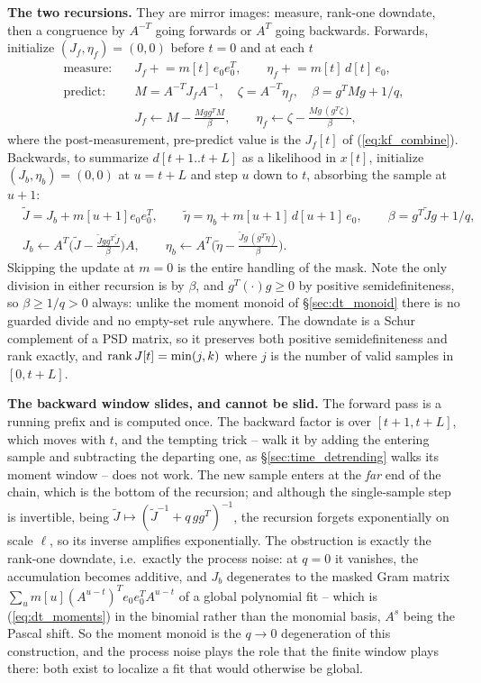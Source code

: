 \documentclass{article}
\numberwithin{equation}{section}   %
\def\nn{\nonumber}
\begin{document}
{\bf The two recursions.}  They are mirror images: measure, rank-one downdate, then a congruence by $A^{-T}$
going forwards or $A^{T}$ going backwards.  Forwards, initialize $(J_f,\eta_f) = (0,0)$ before $t=0$ and at
each $t$
\begin{align}
\mbox{measure:}\quad & J_f \mathrel{+}= m[t]\,e_0e_0^T, \qquad \eta_f \mathrel{+}= m[t]\,d[t]\,e_0, \nn \\
\mbox{predict:}\quad & M = A^{-T}J_fA^{-1}, \quad \zeta = A^{-T}\eta_f, \quad \beta = g^TMg + 1/q, \nn \\
& J_f \leftarrow M - \frac{Mgg^TM}{\beta}, \qquad
  \eta_f \leftarrow \zeta - \frac{Mg\,(g^T\zeta)}{\beta} ,
\label{eq:kf_fwd}
\end{align}
where the post-measurement, pre-predict value is the $J_f[t]$ of (\ref{eq:kf_combine}).  Backwards, to
summarize $d[t{+}1..t{+}L]$ as a likelihood in $x[t]$, initialize $(J_b,\eta_b) = (0,0)$ at $u = t{+}L$ and
step $u$ down to $t$, absorbing the sample at $u{+}1$:
\begin{align}
& \tilde J = J_b + m[u{+}1]e_0e_0^T, \qquad \tilde\eta = \eta_b + m[u{+}1]\,d[u{+}1]\,e_0, \qquad
  \beta = g^T\tilde Jg + 1/q, \nn \\
& J_b \leftarrow A^T\Big(\tilde J - \frac{\tilde Jgg^T\tilde J}{\beta}\Big)A, \qquad
  \eta_b \leftarrow A^T\Big(\tilde\eta - \frac{\tilde Jg\,(g^T\tilde\eta)}{\beta}\Big) .
\label{eq:kf_bwd}
\end{align}
Skipping the update at $m=0$ is the entire handling of the mask.  Note the only division in either recursion
is by $\beta$, and $g^T(\cdot)g \ge 0$ by positive semidefiniteness, so $\beta \ge 1/q > 0$ always: unlike the
moment monoid of \S\ref{sec:dt_monoid} there is no guarded divide and no empty-set rule anywhere.  The
downdate is a Schur complement of a PSD matrix, so it preserves both positive semidefiniteness and rank
exactly, and ${\rm rank}\,J[t] = \min(j,k)$ where $j$ is the number of valid samples in $[0,t+L]$.

{\bf The backward window slides, and cannot be slid.}  The forward pass is a running prefix and is computed
once.  The backward factor is over $[t{+}1,t{+}L]$, which moves with $t$, and the tempting trick -- walk it by
adding the entering sample and subtracting the departing one, as \S\ref{sec:time_detrending} walks its moment
window -- does not work.  The new sample enters at the {\em far} end of the chain, which is the bottom of the
recursion; and although the single-sample step is invertible, being
$\tilde J \mapsto (\tilde J^{-1} + q\,gg^T)^{-1}$, the recursion forgets exponentially on scale $\ell$, so its
inverse amplifies exponentially.  The obstruction is exactly the rank-one downdate, i.e.~exactly the process
noise: at $q = 0$ it vanishes, the accumulation becomes additive, and $J_b$ degenerates to the masked Gram
matrix $\sum_u m[u](A^{u-t})^Te_0e_0^TA^{u-t}$ of a global polynomial fit -- which is
(\ref{eq:dt_moments}) in the binomial rather than the monomial basis, $A^s$ being the Pascal shift.  So the
moment monoid is the $q \rightarrow 0$ degeneration of this construction, and the process noise plays the
role that the finite window plays there: both exist to localize a fit that would otherwise be global.
\end{document}
